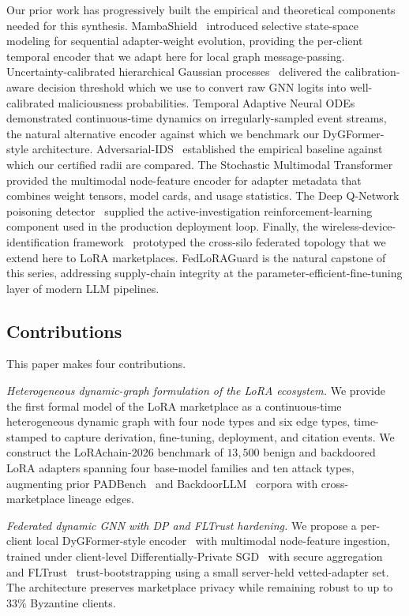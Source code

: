 \documentclass[12pt,a4paper]{article}
\theoremstyle{definition}
\theoremstyle{remark}
\newcommand{\modelname}{FedLoRAGuard}
\newcommand{\benchname}{LoRAchain-2026}
\begin{document}
Our prior work has progressively built the empirical and theoretical components needed for this synthesis. MambaShield~\cite{anaedevha2025mambashield} introduced selective state-space modeling for sequential adapter-weight evolution, providing the per-client temporal encoder that we adapt here for local graph message-passing. Uncertainty-calibrated hierarchical Gaussian processes~\cite{anaedevha2026uchgp} delivered the calibration-aware decision threshold which we use to convert raw GNN logits into well-calibrated maliciousness probabilities. Temporal Adaptive Neural ODEs~\cite{anaedevha2026tanode} demonstrated continuous-time dynamics on irregularly-sampled event streams, the natural alternative encoder against which we benchmark our DyGFormer-style architecture. Adversarial-IDS~\cite{anaedevha2024adversarial} established the empirical baseline against which our certified radii are compared. The Stochastic Multimodal Transformer~\cite{anaedevha2025stochastic} provided the multimodal node-feature encoder for adapter metadata that combines weight tensors, model cards, and usage statistics. The Deep Q-Network poisoning detector~\cite{anaedevha2025dqn} supplied the active-investigation reinforcement-learning component used in the production deployment loop. Finally, the wireless-device-identification framework~\cite{anaedevha2024wireless} prototyped the cross-silo federated topology that we extend here to LoRA marketplaces. \modelname{} is the natural capstone of this series, addressing supply-chain integrity at the parameter-efficient-fine-tuning layer of modern LLM pipelines.

\subsection{Contributions}

This paper makes four contributions.

\textit{Heterogeneous dynamic-graph formulation of the LoRA ecosystem.} We provide the first formal model of the LoRA marketplace as a continuous-time heterogeneous dynamic graph with four node types and six edge types, time-stamped to capture derivation, fine-tuning, deployment, and citation events. We construct the \benchname{} benchmark of $13{,}500$ benign and backdoored LoRA adapters spanning four base-model families and ten attack types, augmenting prior PADBench~\cite{sun2025peftguard} and BackdoorLLM~\cite{li2025backdoorllm} corpora with cross-marketplace lineage edges.

\textit{Federated dynamic GNN with DP and FLTrust hardening.} We propose a per-client local DyGFormer-style encoder~\cite{yu2023dygformer} with multimodal node-feature ingestion, trained under client-level Differentially-Private SGD~\cite{abadi2016deep,mironov2017renyi} with secure aggregation~\cite{bonawitz2017practical} and FLTrust~\cite{cao2021fltrust} trust-bootstrapping using a small server-held vetted-adapter set. The architecture preserves marketplace privacy while remaining robust to up to $33\%$ Byzantine clients.
\end{document}
